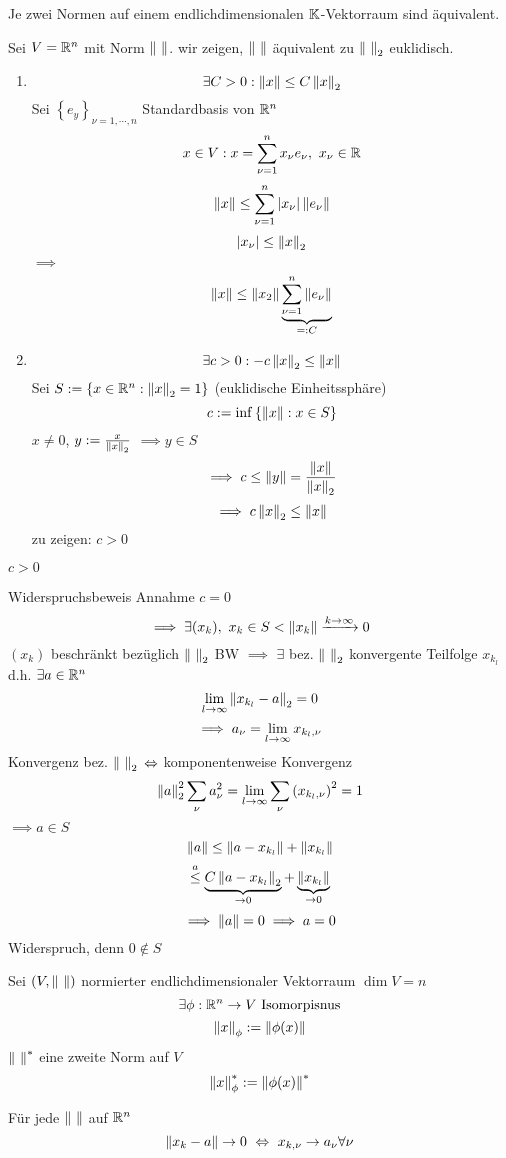 \begin{Sat}
  Je zwei Normen auf einem endlichdimensionalen $\mathbb{K}$-Vektorraum sind äquivalent.
\end{Sat}
\begin{Bew}
   Sei $V=\mathbb{R}^n$ mit Norm $\left\| \  \right\|$. wir zeigen, $\left\| \  \right\|$ äquivalent zu $\left\| \  \right\|_2$ euklidisch.
  \begin{enumerate}
    \item 
      \[\exists C>0:\left\| x \right\|\leq C\left\| x \right\|_2\]
      Sei $\left\{ e_y \right\}_{\nu=1,\cdots,n}$ Standardbasis von $\mathbb{R}^n$
      \[x\in V:x=\sum^n_{\nu=1}x_\nu e_\nu,\ x_\nu\in \mathbb{R}\]
      \[\left\| x \right\|\leq \sum^n_{\nu=1}\left| x_\nu \right|\left\| e_\nu \right\|\]
      \[\left| x_\nu \right|\leq \left\| x \right\|_2\]
      $\implies$
      \[\left\| x \right\|\leq\left\| x_2 \right\|\underbrace{\sum^n_{\nu=1}\left\| e_\nu \right\|}_{=:C}\]
    \item
      \[\exists c>0:-c\left\| x \right\|_2\leq \left\| x \right\|\]
      Sei $S:=\left\{ x\in\mathbb{R}^n:\left\| x \right\|_2=1 \right\}$ (euklidische Einheitssphäre)
      \[c:=\inf\left\{ \left\| x \right\|:x\in S \right\}\]
      $x\neq 0$, $y:=\frac{x}{\left\| x \right\|_2}$ $\implies y\in S$
      \[\implies c\leq \left\| y \right\|=\frac{\left\| x \right\|}{\left\| x \right\|_2}\]
      \[\implies c\left\| x \right\|_2\leq\left\| x \right\|\]
      zu zeigen: $c>0$
  \end{enumerate}
\end{Bew}
\begin{Lem}
  $c>0$
\end{Lem}
\begin{Bew}{Widerspruchsbeweis}
  Annahme $c=0$
  \[\implies \exists (x_k),\ x_k\in S< \left\| x_k \right\|\xrightarrow{k\to\infty}0\]
  $(x_k)$ beschränkt bezüglich $\left\| \  \right\|_2$ BW $\implies$ $\exists$ bez. $\left\| \  \right\|_2$ konvergente Teilfolge $x_{k_l}$ d.h. $\exists a\in \mathbb{R}^n$
  \[\displaystyle\lim_{l\rightarrow\infty}\left\| x_{k_l}-a \right\|_2=0\]
  \[\implies a_\nu=\displaystyle\lim_{l\rightarrow\infty}x_{k_l,\nu}\]
  Konvergenz bez. $\left\| \  \right\|_2$ $\Leftrightarrow$ komponentenweise Konvergenz
  \[\left\| a \right\|_2^2\sum_{\nu}a_\nu^2=\displaystyle\lim_{l\rightarrow\infty}\sum_\nu\left( x_{k_l,\nu} \right)^2=1\]
  $\implies a\in S$
  \[\left\| a \right\|\leq \left\| a-x_{k_l} \right\|+\left\| x_{k_l} \right\|\]
  \[\stackrel{a}{\leq}\underbrace{C\left\| a-x_{k_l} \right\|_2}_{\to 0}+\underbrace{\left\| x_{k_l} \right\|}_{\to 0}\]
  \[\implies \left\| a \right\|=0\implies a=0\]
  Widerspruch, denn $0\not\in S$
\end{Bew}
\begin{Bew}
  Sei $(V,\left\| \  \right\|)$ normierter endlichdimensionaler Vektorraum $\dim V=n$
  \[\exists\phi:\mb{R}^n\to V\ \text{Isomorpisnus}\]
  \[\left\| x \right\|_\phi:=\left\| \phi(x) \right\|\]
  $\left\| \  \right\|^*$ eine zweite Norm auf $V$
  \[\left\| x \right\|^*_\phi:=\left\| \phi(x) \right\|^*\]
\end{Bew}
\begin{Kor}
  Für jede $\left\| \  \right\|$ auf $\mathbb{R}^n$
  \[\left\| x_k-a \right\|\to 0\ \Leftrightarrow\ x_{k,\nu}\to a_\nu \forall \nu\]
\end{Kor}
